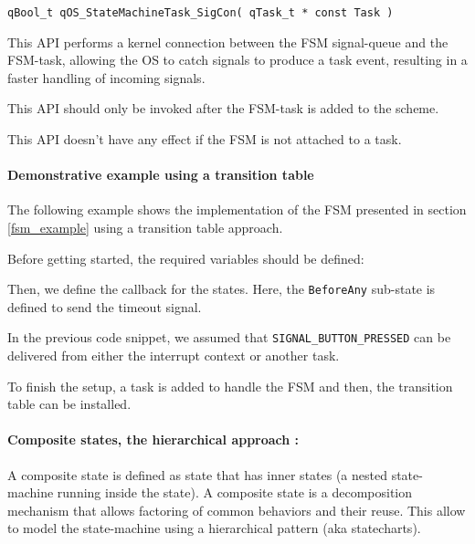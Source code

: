 \begin{lstlisting}[style=CStyle]
qBool_t qOS_StateMachineTask_SigCon( qTask_t * const Task )
\end{lstlisting} 

This API performs a kernel connection between the FSM signal-queue and the FSM-task, allowing the OS to catch signals to produce a task event, resulting in a faster handling of incoming signals.
\medskip

\begin{tcolorbox}
\HandRight This API should only be invoked after the FSM-task is added to the scheme.
\end{tcolorbox}

\begin{tcolorbox}
\HandRight This API doesn't have any effect if the FSM is not attached to a task.
\end{tcolorbox}

\paragraph{Demonstrative example using a transition table}
The following example shows the implementation of the FSM presented in section \ref{fsm_example} using a transition table approach.

Before getting started, the required variables should be defined: 
\medskip



Then, we define the callback for the states. Here, the \lstinline{BeforeAny} sub-state is defined to send the timeout signal. 
\medskip



In the previous code snippet, we assumed that \lstinline{SIGNAL_BUTTON_PRESSED} can be delivered from either the interrupt context or another task.

To finish the setup, a task is added to handle the FSM and then, the transition table can be installed.
\medskip



\paragraph{Composite states, the hierarchical approach : } A composite state is defined as state that has inner states (a nested state-machine running inside the state). A composite state is a decomposition mechanism that allows factoring of common behaviors and their reuse. This allow to model the state-machine using a hierarchical pattern (aka statecharts). 

